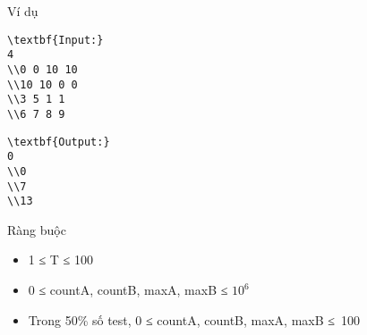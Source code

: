 Ví dụ  
\begin{verbatim}
\textbf{Input:}
4
\\0 0 10 10
\\10 10 0 0
\\3 5 1 1
\\6 7 8 9 \end{verbatim}
\begin{verbatim}
\textbf{Output:}
0
\\0
\\7
\\13 \end{verbatim}
   Ràng buộc  
\begin{itemize}
	\item     1 ≤ T ≤ 100   
	\item     0 ≤ countA, countB, maxA, maxB ≤ $10^{6}$
	\item     Trong 50\% số test, 0 ≤ countA, countB, maxA, maxB ≤ 100   
\end{itemize}